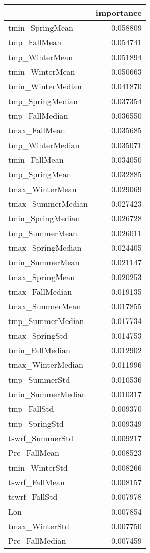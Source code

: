 \begin{tabular}{lr}
\toprule
 & importance \\
\midrule
tmin_SpringMean & 0.058809 \\
tmp_FallMean & 0.054741 \\
tmp_WinterMean & 0.051894 \\
tmin_WinterMean & 0.050663 \\
tmin_WinterMedian & 0.041870 \\
tmp_SpringMedian & 0.037354 \\
tmp_FallMedian & 0.036550 \\
tmax_FallMean & 0.035685 \\
tmp_WinterMedian & 0.035071 \\
tmin_FallMean & 0.034050 \\
tmp_SpringMean & 0.032885 \\
tmax_WinterMean & 0.029069 \\
tmax_SummerMedian & 0.027423 \\
tmin_SpringMedian & 0.026728 \\
tmp_SummerMean & 0.026011 \\
tmax_SpringMedian & 0.024405 \\
tmin_SummerMean & 0.021147 \\
tmax_SpringMean & 0.020253 \\
tmax_FallMedian & 0.019135 \\
tmax_SummerMean & 0.017855 \\
tmp_SummerMedian & 0.017734 \\
tmax_SpringStd & 0.014753 \\
tmin_FallMedian & 0.012902 \\
tmax_WinterMedian & 0.011996 \\
tmp_SummerStd & 0.010536 \\
tmin_SummerMedian & 0.010317 \\
tmp_FallStd & 0.009370 \\
tmp_SpringStd & 0.009349 \\
tswrf_SummerStd & 0.009217 \\
Pre_FallMean & 0.008523 \\
tmin_WinterStd & 0.008266 \\
tswrf_FallMean & 0.008157 \\
tswrf_FallStd & 0.007978 \\
Lon & 0.007854 \\
tmax_WinterStd & 0.007750 \\
Pre_FallMedian & 0.007459 \\

\end{tabular}
